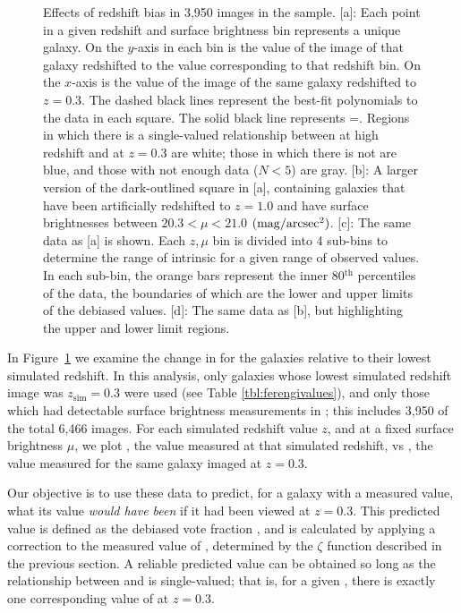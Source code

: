 \documentclass[twocolumn]{aastex6}
\begin{document}
\begin{figure}
\caption{Effects of redshift bias in 3,950 images in the \ferengi{} sample. [a]: Each point in a given redshift and surface brightness bin represents a unique galaxy. On the $y$-axis in each bin is the \pfeatures{} value of the image of that galaxy redshifted to the value corresponding to that redshift bin. On the $x$-axis is the \pfeatures{} value of the image of the same galaxy redshifted to $z=0.3$. The dashed black lines represent the best-fit polynomials to the data in each square. The solid black line represents \pfeaturesz=\pfeaturesrest. Regions in which there is a single-valued relationship between \pfeatures{} at high redshift and at $z=0.3$ are white; those in which there is not are blue, and those with not enough data ($N<5$) are gray. [b]: A larger version of the dark-outlined square in [a], containing \ferengi{} galaxies that have been artificially redshifted to $z=1.0$ and have surface brightnesses between $20.3 < \mu < 21.0$ $\rm (mag/arcsec^2)$. [c]: The same data as [a] is shown. Each $z,\mu$ bin is divided into 4 sub-bins to determine the range of intrinsic \pfeaturesrest{} for a given range of observed \pfeaturesz{} values. In each sub-bin, the orange bars represent the inner 80$^\mathrm{th}$ percentiles of the data, the boundaries of which are the lower and upper limits of the debiased values. [d]: The same data as [b], but highlighting the upper and lower limit regions.}
\label{fig:p_vs_p}
\end{figure}

In Figure~\ref{fig:p_vs_p} we examine the change in \pfeatures{} for the \ferengi{} galaxies relative to their lowest simulated redshift. In this analysis, only galaxies whose lowest simulated redshift image was $z_\mathrm{sim}=0.3$ were used (see Table \ref{tbl:ferengivalues}), and only those which had detectable surface brightness measurements in \sextractor; this includes 3,950 of the total 6,466 images. For each simulated redshift value $z$, and at a fixed surface brightness $\mu$, we plot \pfeaturesz, the value measured at that simulated redshift, vs \pfeaturesrest, the value measured for the same galaxy imaged at $z=0.3$. 
 
Our objective is to use these data to predict, for a galaxy with a measured \pfeaturesz{} value, what its \pfeatures{} value \emph{would have been} if it had been viewed at $z=0.3$. This predicted value is defined as the debiased vote fraction \pfeaturesdebiased, and is calculated by applying a correction to the measured value of \pfeatures, determined by the $\zeta$ function described in the previous section. A reliable predicted value can be obtained so long as the relationship between \pfeaturesz{} and \pfeaturesrest{} is single-valued; that is, for a given \pfeaturesz, there is exactly one corresponding value of \pfeatures{} at $z=0.3$. 
\end{document}
